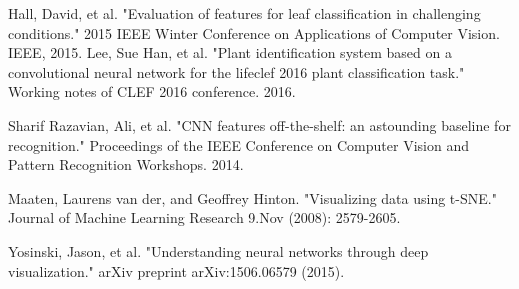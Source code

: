 \documentclass[journal, 10pt]{IEEEtran}
\begin{document}
\begin{thebibliography}{1}
    Hall, David, et al. "Evaluation of features for leaf classification in challenging conditions." 2015 IEEE Winter Conference on Applications of Computer Vision. IEEE, 2015.
    Lee, Sue Han, et al. "Plant identification system based on a convolutional neural network for the lifeclef 2016 plant classification task." Working notes of CLEF 2016 conference. 2016.

    Sharif Razavian, Ali, et al. "CNN features off-the-shelf: an astounding baseline for recognition." Proceedings of the IEEE Conference on Computer Vision and Pattern Recognition Workshops. 2014.

    Maaten, Laurens van der, and Geoffrey Hinton. "Visualizing data using t-SNE." Journal of Machine Learning Research 9.Nov (2008): 2579-2605.

    Yosinski, Jason, et al. "Understanding neural networks through deep visualization." arXiv preprint arXiv:1506.06579 (2015).

\end{thebibliography}

%






\end{document}
